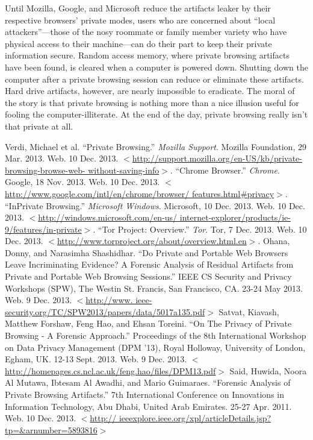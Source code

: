 \documentclass[pdftex,letterpaper,titlepage,12pt]{article}
\begin{document}
  Until Mozilla, Google, and Microsoft reduce the artifacts leaker by their
  respective browsers' private modes, users who are concerned about ``local 
  attackers''---those of the nosy roommate or family member variety who have 
  physical access to their machine---can do their part to keep their private
  information secure. Random access memory, where private browsing artifacts
  have been found, is cleared when a computer is powered down. Shutting down
  the computer after a private browsing session can reduce or eliminate these
  artifacts. Hard drive artifacts, however, are nearly impossible to eradicate.
  The moral of the story is that private browsing is nothing more than a nice
  illusion useful for fooling the computer-illiterate. At the end of the day,
  private browsing really isn't that private at all.

  \singlespacing
  \begin{thebibliography}{9}
      Verdi, Michael et al. ``Private Browsing.'' \emph{Mozilla Support}. 
      Mozilla Foundation, 29 Mar. 2013. Web. 10 Dec. 2013. 
      $<$\url{http://support.mozilla.org/en-US/kb/private-browsing-browse-web-
      without-saving-info}$>$.
      ``Chrome Browser.'' \emph{Chrome}. Google, 18 Nov. 2013. Web. 10 Dec. 
      2013. $<$\url{http://www.google.com/intl/en/chrome/browser/
      features.html#privacy}$>$.
      ``InPrivate Browsing.'' \emph{Microsoft Windows}. Microsoft, 10 Dec. 
      2013. Web. 10 Dec. 2013. $<$\url{http://windows.microsoft.com/en-us/
      internet-explorer/products/ie-9/features/in-private}$>$.
      ``Tor Project: Overview.'' \emph{Tor}. Tor, 7 Dec. 2013. Web. 10 Dec. 
      2013. $<$\url{http://www.torproject.org/about/overview.html.en}$>$. 
      Ohana, Donny, and Narasimha Shashidhar. ``Do Private and Portable Web 
      Browsers Leave Incriminating Evidence? A Forensic Analysis of Residual 
      Artifacts from Private and Portable Web Browsing Sessions.'' IEEE CS 
      Security and Privacy Workshops (SPW), The Westin St. Francis, 
      San Francisco, CA. 23-24 May 2013. Web. 9 Dec. 2013. $<$\url{http://www.
      ieee-security.org/TC/SPW2013/papers/data/5017a135.pdf}$>$
      Satvat, Kiavash, Matthew Forshaw, Feng Hao, and Ehsan Toreini. ``On The 
      Privacy of Private Browsing - A Forensic Approach.'' Proceedings of the 
      8th International Workshop on Data Privacy Management (DPM '13), Royal 
      Holloway, University of London, Egham, UK. 12-13 Sept. 2013. Web. 9 Dec.
      2013. $<$\url{http://homepages.cs.ncl.ac.uk/feng.hao/files/DPM13.pdf}$>$ 
      Said, Huwida, Noora Al Mutawa, Ibtesam Al Awadhi, and Mario Guimaraes.
      ``Forensic Analysis of Private Browsing Artifacts.'' 7th International
      Conference on Innovations in Information Technology, Abu Dhabi, United
      Arab Emirates. 25-27 Apr. 2011. Web. 10 Dec. 2013. $<$\url{http://
      ieeexplore.ieee.org/xpl/articleDetails.jsp?tp=&arnumber=5893816}$>$ 

  \end{thebibliography}
\end{document}
